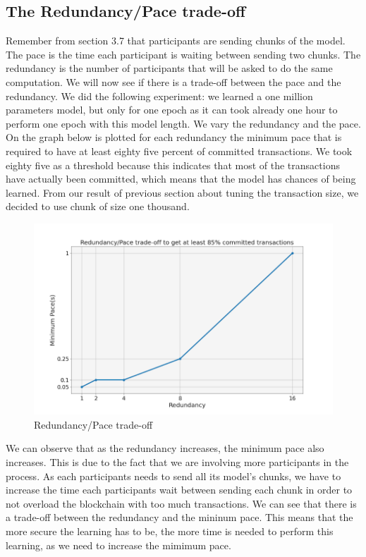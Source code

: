 \documentclass{article}
\begin{document}
\subsection{The Redundancy/Pace trade-off}
Remember from section 3.7 that participants are sending chunks of the model. The pace is the time each participant is
waiting between sending two chunks. The redundancy is the number of participants that will be asked to do the same
computation. We will now see if there is a trade-off between the pace and the redundancy. We did the following experiment:
we learned a one million parameters model, but only for one epoch as it can took already one hour to perform one epoch with
this model length. We vary the redundancy and the pace. On the graph below is plotted for each
redundancy the minimum pace that is required to have at least eighty five percent of committed transactions. We took
eighty five as a threshold because this indicates that most of the transactions have actually been committed, which
means that the model has chances of being learned. From our result of previous section about tuning the
transaction size, we decided to use chunk of size one thousand.
\begin{figure}[H]
    \hspace*{-2cm}
        \includegraphics[scale=0.7]{redundancy_pace}
    \hspace{2mm}%
    \caption{Redundancy/Pace trade-off}
\end{figure}
We can observe that as the redundancy increases, the minimum pace also increases. This is due to the fact that we are
involving more participants in the process. As each participants needs to send all its model's chunks, we have to
increase the time each participants wait between sending each chunk in order to not overload the blockchain with
too much transactions. We can see that there is a trade-off between the redundancy and the mininum pace. This means
that the more secure the learning has to be, the more time is needed to perform this learning, as we need to increase
the mimimum pace.
\end{document}
